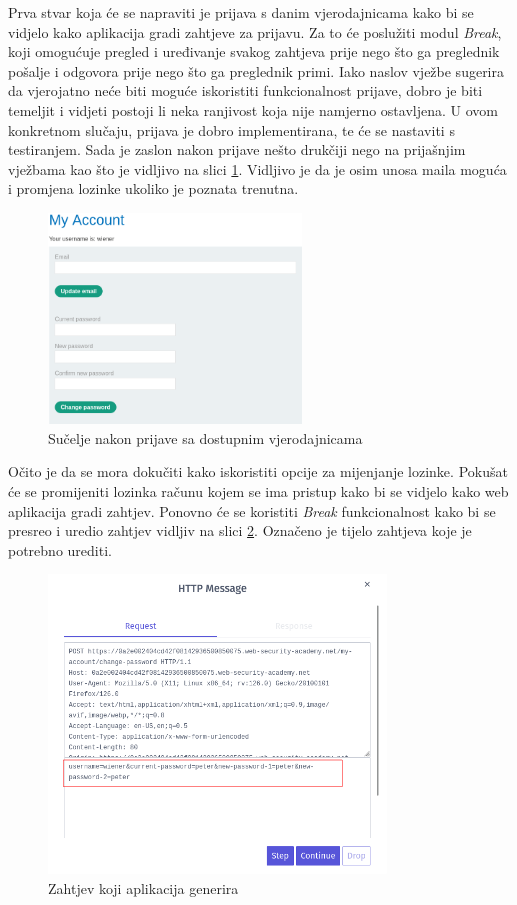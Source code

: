 Prva stvar koja će se napraviti je prijava s danim vjerodajnicama kako bi se vidjelo kako aplikacija gradi zahtjeve za prijavu. 
Za to će poslužiti modul \textit{Break}, koji omogućuje pregled i uređivanje svakog zahtjeva prije nego što ga preglednik pošalje i odgovora prije nego što ga preglednik primi. 
Iako naslov vježbe sugerira da vjerojatno neće biti moguće iskoristiti funkcionalnost prijave, dobro je biti temeljit i vidjeti postoji li neka ranjivost koja nije namjerno ostavljena. 
U ovom konkretnom slučaju, prijava je dobro implementirana, te će se nastaviti s testiranjem. 
Sada je zaslon nakon prijave nešto drukčiji nego na prijašnjim vježbama kao što je vidljivo na slici \ref{slk:succ_login}. Vidljivo je da je osim unosa maila moguća i promjena lozinke ukoliko je poznata trenutna.
\begin{figure}[H]
  \centering
  \includegraphics[width=0.6\textwidth]{slike/b_f_postLogin.png}
  \caption{Sučelje nakon prijave sa dostupnim vjerodajnicama}
  \label{slk:succ_login}
\end{figure}

Očito je da se mora dokučiti kako iskoristiti opcije za mijenjanje lozinke. 
Pokušat će se promijeniti lozinka računu kojem se ima pristup kako bi se vidjelo kako web aplikacija gradi zahtjev. 
Ponovno će se koristiti \textit{Break} funkcionalnost kako bi se presreo i uredio zahtjev vidljiv na slici \ref{slk:gen_req}. 
Označeno je tijelo zahtjeva koje je potrebno urediti.

\begin{figure}[H]
  \centering
  \includegraphics[width=0.8\textwidth]{slike/break_np.png}
  \caption{Zahtjev koji aplikacija generira}
  \label{slk:gen_req}
\end{figure}

